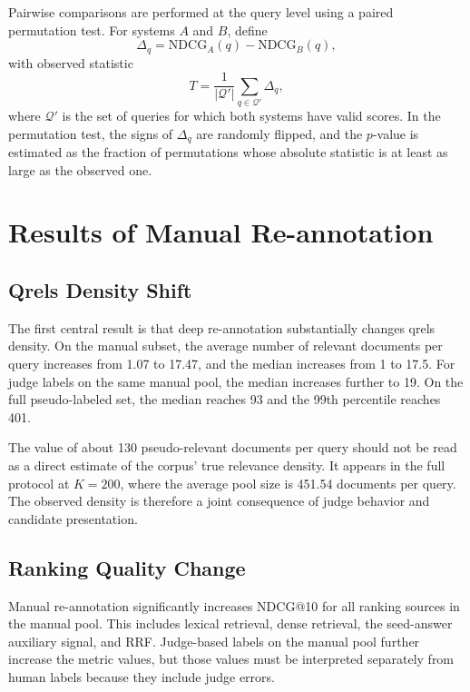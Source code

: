 \documentclass[runningheads,a4paper]{llncs}
\begin{document}
Pairwise comparisons are performed at the query level using a paired permutation test. For systems $A$ and $B$, define
\begin{equation}
\label{eq:delta}
\Delta_q = \mathrm{NDCG}_A(q) - \mathrm{NDCG}_B(q),
\end{equation}
with observed statistic
\begin{equation}
\label{eq:perm}
T = \frac{1}{|\mathcal{Q}'|} \sum_{q \in \mathcal{Q}'} \Delta_q,
\end{equation}
where $\mathcal{Q}'$ is the set of queries for which both systems have valid scores. In the permutation test, the signs of $\Delta_q$ are randomly flipped, and the $p$-value is estimated as the fraction of permutations whose absolute statistic is at least as large as the observed one.

\section{Results of Manual Re-annotation}

\subsection{Qrels Density Shift}

The first central result is that deep re-annotation substantially changes qrels density. On the manual subset, the average number of relevant documents per query increases from 1.07 to 17.47, and the median increases from 1 to 17.5. For judge labels on the same manual pool, the median increases further to 19. On the full pseudo-labeled set, the median reaches 93 and the 99th percentile reaches 401.

The value of about 130 pseudo-relevant documents per query should not be read as a direct estimate of the corpus' true relevance density. It appears in the full protocol at $K=200$, where the average pool size is 451.54 documents per query. The observed density is therefore a joint consequence of judge behavior and candidate presentation.

\subsection{Ranking Quality Change}

Manual re-annotation significantly increases NDCG@10 for all ranking sources in the manual pool. This includes lexical retrieval, dense retrieval, the seed-answer auxiliary signal, and RRF. Judge-based labels on the manual pool further increase the metric values, but those values must be interpreted separately from human labels because they include judge errors.
\end{document}
